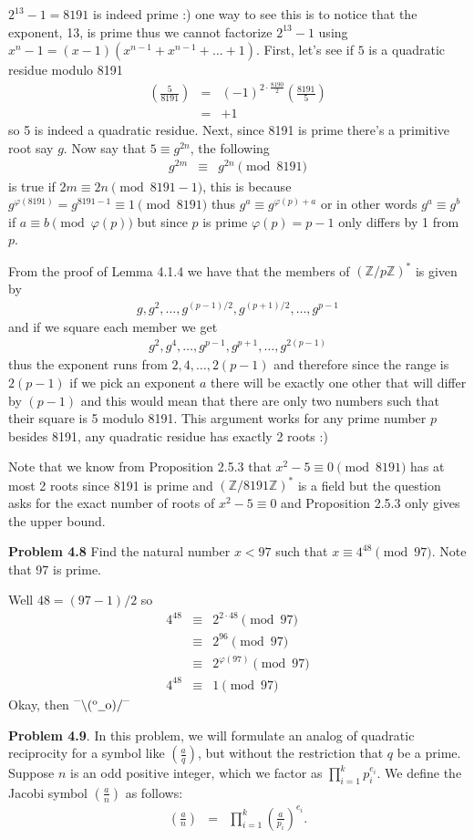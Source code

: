 \documentclass[aps,preprint,preprintnumbers,nofootinbib,showpacs,prd]{revtex4-1}
\newcommand{\nbea}{\begin{eqnarray*}}
\newcommand{\neea}{\end{eqnarray*}}
\newcommand{\dunno}{$ {}^{\mbox {--}}\backslash(^{\rm o}{}\underline{\hspace{0.2cm}}{\rm o})/^{\mbox {--}}$}
\begin{document}
$2^{13}-1 = 8191$ is indeed prime :) one way to see this is to notice that the exponent, 13, is prime thus we cannot factorize $2^{13}-1$ using $x^n-1 = (x-1)(x^{n-1} + x^{n-1} + \dots + 1)$. First, let's see if $5$ is a quadratic residue modulo 8191
%
\nbea
\left ( \frac{5}{8191} \right ) & = & (-1)^{2\cdot\frac{8190}{2}} \left ( \frac{8191}{5} \right ) \\
& = & +1
\neea
%
so 5 is indeed a quadratic residue. Next, since 8191 is prime there's a primitive root say $g$. Now say that $5 \equiv g^{2n}$, the following
%
\nbea
g^{2m} & \equiv & g^{2n} \pmod{8191}
\neea
%
is true if $2m \equiv 2n \pmod{8191-1}$, this is because $g^{\varphi(8191)} = g^{8191-1} \equiv 1 \pmod{8191}$ thus $g^a \equiv g^{\varphi(p) + a}$ or in other words $g^a \equiv g^b$ if $a \equiv b \pmod{\varphi(p)}$ but since $p$ is prime $\varphi(p) = p-1$ only differs by 1 from $p$.

From the proof of Lemma 4.1.4 we have that the members of $(\mathbb{Z}/p\mathbb{Z})^*$ is given by
%
\nbea
g,g^2,\dots,g^{(p-1)/2},g^{(p+1)/2},\dots,g^{p-1}
\neea
%
and if we square each member we get
%
\nbea
g^2,g^4,\dots,g^{p-1},g^{p+1},\dots,g^{2(p-1)}
\neea
%
thus the exponent runs from $2, 4, \dots, 2(p-1)$ and therefore since the range is $2(p-1)$ if we pick an exponent $a$ there will be exactly one other that will differ by $(p-1)$ and this would mean that there are only two numbers such that their square is 5 modulo 8191. This argument works for any prime number $p$ besides 8191, any quadratic residue has exactly 2 roots :)

Note that we know from Proposition 2.5.3 that $x^2 - 5 \equiv 0 \pmod{8191}$ has at most 2 roots since 8191 is prime and $(\mathbb{Z}/8191\mathbb{Z})^*$ is a field but the question asks for the exact number of roots of $x^2 - 5 \equiv 0$ and Proposition 2.5.3 only gives the upper bound.

{\bf Problem 4.8} Find the natural number $x < 97$ such that $x \equiv 4^{48} \pmod {97}$. Note that 97 is prime.

Well $48 = (97-1)/2$ so
%
\nbea
4^{48} & \equiv & 2^{2\cdot 48}\pmod{97} \\
& \equiv & 2^{96} \pmod{97} \\
& \equiv & 2^{\varphi(97)} \pmod{97} \\
4^{48} & \equiv & 1 \pmod{97}
\neea
%
Okay, then \dunno

{\bf Problem 4.9}. In this problem, we will formulate an analog of quadratic reciprocity for a symbol like $\left( \frac{a} {q} \right )$, but without the restriction that $q$ be a prime. Suppose $n$ is an odd positive integer, which we factor as $\prod^k_{i=1} p_i^{e_i}$. We define the Jacobi symbol $\left (\frac{a}{n}\right )$ as follows: 
%
\nbea
\left ( \frac{a}{n}\right ) & = & \prod_{i=1}^k \left ( \frac{a}{p_i} \right )^{e_i}. 
\neea
%
\end{document}
